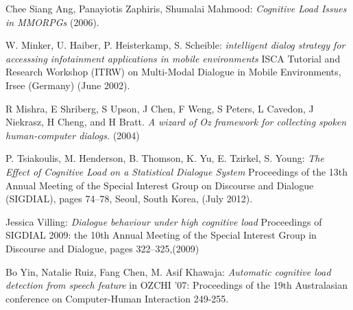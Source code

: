 \documentclass[12pt,a4paper]{scrartcl}
\begin{document}
%
%

\begin{thebibliography}{Maron \& Ames, 1982}

	 Chee Siang Ang, Panayiotis Zaphiris, Shumalai Mahmood: \textit{Cognitive Load Issues in MMORPGs} 
(2006).

	 W. Minker, U. Haiber, P. Heisterkamp, S. 
Scheible: \textit{intelligent dialog strategy for accesssing infotainment applications in mobile 
environments} ISCA Tutorial and Research Workshop (ITRW) on Multi-Modal Dialogue in Mobile 
Environments, Irsee (Germany) (June 2002).

 R Mishra, E Shriberg, S Upson, J Chen, F Weng, S Peters,
L Cavedon, J Niekrasz, H Cheng, and H Bratt. \textit{A wizard of Oz framework for collecting spoken human-computer dialogs.} (2004)

	 P. Tsiakoulis, M. Henderson, B. Thomson, K. Yu, E. Tzirkel, S. Young: \textit{The Effect of Cognitive Load on a Statistical Dialogue System} Proceedings of the 13th Annual Meeting of the Special Interest Group on Discourse and Dialogue (SIGDIAL), pages 74–78,
Seoul, South Korea, (July 2012).

 Jessica Villing: \textit{Dialogue behaviour under high cognitive load} Proceedings of SIGDIAL 2009: the 10th Annual Meeting of the Special Interest Group in Discourse and Dialogue, pages 322–325,(2009)



 Bo Yin, Natalie Ruiz, Fang Chen, M. Asif Khawaja: \textit{Automatic cognitive load detection from speech feature} in OZCHI ’07: Proceedings of the 19th Australasian conference on Computer-Human Interaction 249-255. 



\end{thebibliography}
\end{document}
